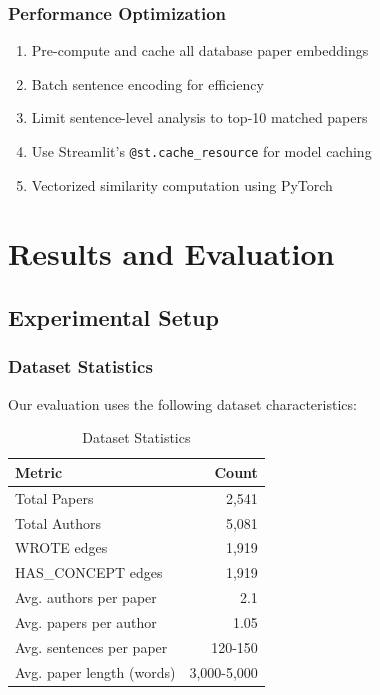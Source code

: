 \documentclass[conference]{IEEEtran}
\begin{document}
\subsubsection{Performance Optimization}
\begin{enumerate}
    \item Pre-compute and cache all database paper embeddings
    \item Batch sentence encoding for efficiency
    \item Limit sentence-level analysis to top-10 matched papers
    \item Use Streamlit's \texttt{@st.cache\_resource} for model caching
    \item Vectorized similarity computation using PyTorch
\end{enumerate}

\section{Results and Evaluation}

\subsection{Experimental Setup}

\subsubsection{Dataset Statistics}
Our evaluation uses the following dataset characteristics:

\begin{table}[htbp]
\caption{Dataset Statistics}
\begin{center}
\begin{tabular}{|l|r|}
\hline
\textbf{Metric} & \textbf{Count} \\
\hline
Total Papers & 2,541 \\
Total Authors & 5,081 \\
WROTE edges & 1,919 \\
HAS\_CONCEPT edges & 1,919 \\
Avg. authors per paper & 2.1 \\
Avg. papers per author & 1.05 \\
Avg. sentences per paper & 120-150 \\
Avg. paper length (words) & 3,000-5,000 \\
\hline
\end{tabular}
\label{tab:dataset_stats}
\end{center}
\end{table}
\end{document}
